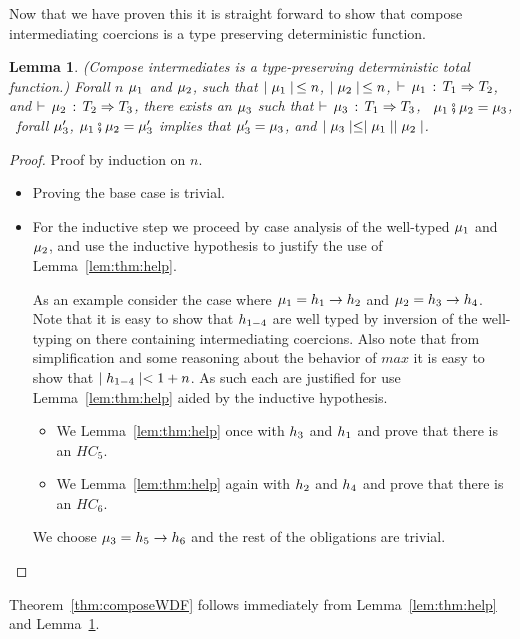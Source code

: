 \documentclass[acmtog, authorversion, acmlarge]{acmart}
\newtheorem{lem}{Lemma}
\begin{document}
Now that we have proven this it is straight forward to show
that compose intermediating coercions is a type preserving
deterministic function. 

\begin{lem}
  \label{lem:composeIWDF}
  (Compose intermediates is a type-preserving deterministic total function.)
  Forall $n$ $\mu_1$ and $\mu_2$, such that
  $\mid \mu_1 \mid \, \le n$, \; $\mid \mu_2 \mid \, \le n$, \;
  $\vdash \, \mu_1 \, : \, T_1 \Rightarrow T_2$, and $\vdash \, \mu_2 \, : \, T_2 \Rightarrow T_3$,
  there exists an $\mu_3$ such that
  $\vdash \, \mu_3 \, : \, T_1 \Rightarrow T_3$, \,
  $\mu_1 \fatsemi \mu_2 = \mu_3$, \,
  forall $\mu_{3}^{\prime}$, \; $\mu_1 \fatsemi \mu_2 = \mu_{3}^{\prime}$
  implies that $\mu_{3}^{\prime} = \mu_{3}$,
  and $\mid \mu_3 \mid \le \mid \mu_1 \mid \mid \mu_2 \mid$.
\end{lem}
\begin{proof}
  Proof by induction on $n$. 
  \begin{itemize}
  \item Proving the base case is trivial.
  \item For the inductive step we proceed by case
    analysis of the well-typed $\mu_1$
    and $\mu_2$, and use the inductive hypothesis to
    justify the use of Lemma~\ref{lem:thm:help}. 

    As an example consider the case where
    $\mu_1 = h_1  \to  h_2$ and
    $\mu_2 = h_3  \to  h_4$.
    Note that it is easy to show that $h_{1-4}$ are well
    typed by inversion of the well-typing on there containing
    intermediating coercions.
    Also note that from simplification and some reasoning
    about the behavior of $max$ it is easy to show that
    $\mid h_{1-4} \mid < 1 + n$.
    As such each are justified for use Lemma~\ref{lem:thm:help}
    aided by the inductive hypothesis.
    \begin{itemize}
    \item We Lemma~\ref{lem:thm:help} once with $h_3$ and $h_1$
      and prove that there is an $HC_5$.
    \item We Lemma~\ref{lem:thm:help} again with $h_2$ and $h_4$
      and prove that there is an $HC_6$.
    \end{itemize}
    We choose $\mu_3 = h_5  \to  h_6$ and the rest of the
    obligations are trivial.
  \end{itemize} 
\end{proof}

Theorem~\ref{thm:composeWDF} follows immediately from
Lemma~\ref{lem:thm:help} and Lemma~\ref{lem:composeIWDF}.
\end{document}
